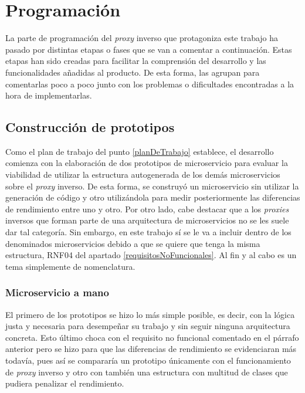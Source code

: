 \documentclass[11pt,spanish,listoffigures]{tfgetsinf}
\begin{document}

	\section{Programación}

La parte de programación del \emph{proxy} inverso que protagoniza este trabajo ha pasado por distintas etapas o fases que se van a comentar a continuación. Estas etapas han sido creadas para facilitar la comprensión del desarrollo y las funcionalidades añadidas al producto. De esta forma, las agrupan para comentarlas poco a poco junto con los problemas o dificultades encontradas a la hora de implementarlas.


		\subsection{Construcción de prototipos}

Como el plan de trabajo del punto \ref{planDeTrabajo} establece, el desarrollo comienza con la elaboración de dos prototipos de microservicio para evaluar la viabilidad de utilizar la estructura autogenerada de los demás microservicios sobre el \emph{proxy} inverso. De esta forma, se construyó un microservicio sin utilizar la generación de código y otro utilizándola para medir posteriormente las diferencias de rendimiento entre uno y otro. Por otro lado, cabe destacar que a los \emph{proxies} inversos que forman parte de una arquitectura de microservicios no se les suele dar tal categoría. Sin embargo, en este trabajo sí se le va a incluir dentro de los denominados microservicios debido a que se quiere que tenga la misma estructura, RNF04 del apartado \ref{requisitosNoFuncionales}. Al fin y al cabo es un tema simplemente de nomenclatura.


			\subsubsection{Microservicio a mano}

El primero de los prototipos se hizo lo más simple posible, es decir, con la lógica justa y necesaria para desempeñar su trabajo y sin seguir ninguna arquitectura concreta. Esto último choca con el requisito no funcional comentado en el párrafo anterior pero se hizo para que las diferencias de rendimiento se evidenciaran más todavía, pues así se compararía un prototipo únicamente con el funcionamiento de \emph{proxy} inverso y otro con también una estructura con multitud de clases que pudiera penalizar el rendimiento.
\end{document}
